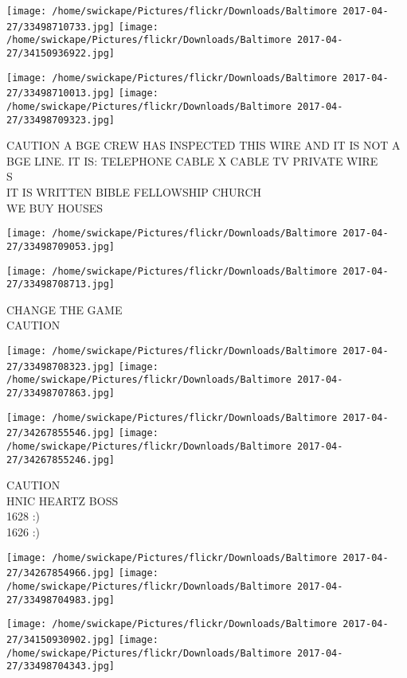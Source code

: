 \documentclass[10pt,letterpaper]{article}
\begin{document}
\texttt{[image: /home/swickape/Pictures/flickr/Downloads/Baltimore 2017-04-27/33498710733.jpg]}
\texttt{[image: /home/swickape/Pictures/flickr/Downloads/Baltimore 2017-04-27/34150936922.jpg]}

\texttt{[image: /home/swickape/Pictures/flickr/Downloads/Baltimore 2017-04-27/33498710013.jpg]}
\texttt{[image: /home/swickape/Pictures/flickr/Downloads/Baltimore 2017-04-27/33498709323.jpg]}

CAUTION A BGE CREW HAS INSPECTED THIS WIRE AND IT IS NOT A BGE LINE.  IT IS: TELEPHONE CABLE X CABLE TV PRIVATE WIRE\\
S\\
IT IS WRITTEN BIBLE FELLOWSHIP CHURCH\\
WE BUY HOUSES\\
\pagebreak

\texttt{[image: /home/swickape/Pictures/flickr/Downloads/Baltimore 2017-04-27/33498709053.jpg]}

\vspace{0.25in}
\texttt{[image: /home/swickape/Pictures/flickr/Downloads/Baltimore 2017-04-27/33498708713.jpg]}

CHANGE THE GAME\\
CAUTION\\
\pagebreak

\texttt{[image: /home/swickape/Pictures/flickr/Downloads/Baltimore 2017-04-27/33498708323.jpg]}
\texttt{[image: /home/swickape/Pictures/flickr/Downloads/Baltimore 2017-04-27/33498707863.jpg]}

\texttt{[image: /home/swickape/Pictures/flickr/Downloads/Baltimore 2017-04-27/34267855546.jpg]}
\texttt{[image: /home/swickape/Pictures/flickr/Downloads/Baltimore 2017-04-27/34267855246.jpg]}

CAUTION\\
HNIC HEARTZ BOSS\\
1628 :)\\
1626 :)\\
\pagebreak

\texttt{[image: /home/swickape/Pictures/flickr/Downloads/Baltimore 2017-04-27/34267854966.jpg]}
\texttt{[image: /home/swickape/Pictures/flickr/Downloads/Baltimore 2017-04-27/33498704983.jpg]}

\texttt{[image: /home/swickape/Pictures/flickr/Downloads/Baltimore 2017-04-27/34150930902.jpg]}
\texttt{[image: /home/swickape/Pictures/flickr/Downloads/Baltimore 2017-04-27/33498704343.jpg]}
\end{document}
